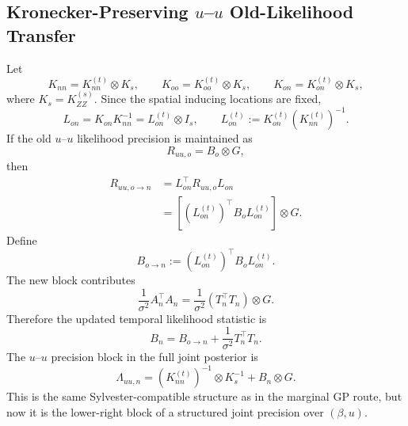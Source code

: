 \documentclass[12pt]{article}
\begin{document}
\subsection{Kronecker-Preserving $u$--$u$ Old-Likelihood Transfer}
\label{subsec:kronecker_preserving_transfer}

Let
\begin{equation}
    K_{nn}=K_{nn}^{(t)}\otimes K_s,
    \qquad
    K_{oo}=K_{oo}^{(t)}\otimes K_s,
    \qquad
    K_{on}=K_{on}^{(t)}\otimes K_s,
\end{equation}
where $K_s=K_{ZZ}^{(s)}$. Since the spatial inducing locations are fixed,
\begin{equation}
    L_{on}=K_{on}K_{nn}^{-1}=L_{on}^{(t)}\otimes I_s,
    \qquad
    L_{on}^{(t)}:=K_{on}^{(t)}(K_{nn}^{(t)})^{-1}.
    \label{eq:temporal_only_transfer_operator}
\end{equation}
If the old $u$--$u$ likelihood precision is maintained as
\begin{equation}
    R_{uu,o}=B_o\otimes G,
\end{equation}
then
\begin{align}
    R_{uu,o\rightarrow n}
    &=L_{on}^\top R_{uu,o}L_{on} \\
    &=
    \left[(L_{on}^{(t)})^\top B_oL_{on}^{(t)}\right]\otimes G.
\end{align}
Define
\begin{equation}
    B_{o\rightarrow n}:=(L_{on}^{(t)})^\top B_oL_{on}^{(t)}.
\end{equation}
The new block contributes
\begin{equation}
    \frac{1}{\sigma^2}A_n^\top A_n
    =
    \frac{1}{\sigma^2}(T_n^\top T_n)\otimes G.
\end{equation}
Therefore the updated temporal likelihood statistic is
\begin{equation}
    B_n
    =
    B_{o\rightarrow n}
    +
    \frac{1}{\sigma^2}T_n^\top T_n.
    \label{eq:temporal_stat_ssgp_transfer}
\end{equation}
The $u$--$u$ precision block in the full joint posterior is
\begin{equation}
    \Lambda_{uu,n}
    =
    (K_{nn}^{(t)})^{-1}\otimes K_s^{-1}
    +
    B_n\otimes G.
    \label{eq:kronecker_precision_after_ssgp_transfer}
\end{equation}
This is the same Sylvester-compatible structure as in the marginal GP route, but now it
is the lower-right block of a structured joint precision over $(\beta,u)$.
\end{document}
